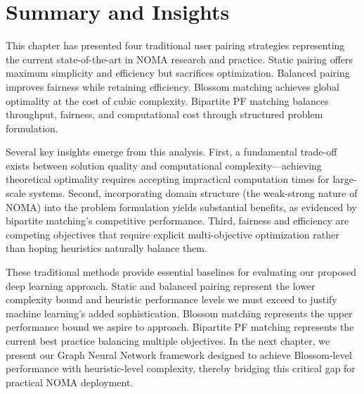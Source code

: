 \section{Summary and Insights}

This chapter has presented four traditional user pairing strategies representing the current state-of-the-art in NOMA research and practice. Static pairing offers maximum simplicity and efficiency but sacrifices optimization. Balanced pairing improves fairness while retaining efficiency. Blossom matching achieves global optimality at the cost of cubic complexity. Bipartite PF matching balances throughput, fairness, and computational cost through structured problem formulation.

Several key insights emerge from this analysis. First, a fundamental trade-off exists between solution quality and computational complexity—achieving theoretical optimality requires accepting impractical computation times for large-scale systems. Second, incorporating domain structure (the weak-strong nature of NOMA) into the problem formulation yields substantial benefits, as evidenced by bipartite matching's competitive performance. Third, fairness and efficiency are competing objectives that require explicit multi-objective optimization rather than hoping heuristics naturally balance them.

These traditional methods provide essential baselines for evaluating our proposed deep learning approach. Static and balanced pairing represent the lower complexity bound and heuristic performance levels we must exceed to justify machine learning's added sophistication. Blossom matching represents the upper performance bound we aspire to approach. Bipartite PF matching represents the current best practice balancing multiple objectives. In the next chapter, we present our Graph Neural Network framework designed to achieve Blossom-level performance with heuristic-level complexity, thereby bridging this critical gap for practical NOMA deployment.
